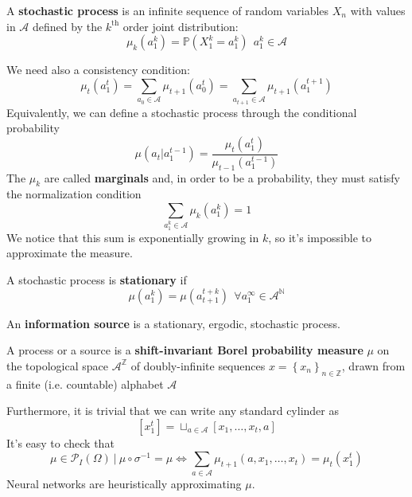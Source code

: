 \begin{definition}
    A \textbf{stochastic process} is an infinite sequence of random variables $X_n$ with values in $\mathcal{A}$ defined by the $k^\text{th}$ order joint distribution:
    \begin{equation*}
        \mu_k\left(a_1^k\right) = \mathbb{P}\left(X_1^k = a_1^k\right) \ \ a_1^k \in \mathcal{A}
    \end{equation*}
\end{definition}
We need also a consistency condition:
\begin{equation*}
    \mu_t\left(a_1^t\right) = \sum_{a_0 \in \mathcal{A}} \mu_{t+1}\left(a_0^t\right) = \sum_{a_{t+1} \in \mathcal{A}} \mu_{t+1}\left(a_1^{t+1}\right)
\end{equation*}
Equivalently, we can define a stochastic process through the conditional probability
\begin{equation*}
    \mu\left(a_t \vert a_1^{t-1}\right) = \frac{\mu_t\left(a_1^t\right)}{\mu_{t-1}\left(a_1^{t-1}\right)}
\end{equation*}
The $\mu_k$ are called \textbf{marginals} and, in order to be a probability, they must satisfy the normalization condition
\begin{equation*}
    \sum_{a_1^k \in \mathcal{A}} \mu_k\left(a_1^k\right) = 1
\end{equation*}
We notice that this sum is exponentially growing in $k$, so it's impossible to approximate the measure.
\begin{definition}
    A stochastic process is \textbf{stationary} if
    \begin{equation*}
        \mu\left(a_1^k\right) = \mu\left(a_{t+1}^{t+k}\right) \ \ \forall a_1^\infty \in \mathcal{A}^\mathbb{N}
    \end{equation*}
\end{definition}
\begin{definition}
    An \textbf{information source} is a stationary, ergodic, stochastic process.
\end{definition}
\begin{definition}
    A process or a source is a \textbf{shift-invariant Borel probability measure} $\mu$ on the topological space $\mathcal{A}^\mathbb{Z}$ of doubly-infinite sequences $x = \left\{x_n\right\}_{n \in \mathbb{Z}}$, drawn from a finite (i.e. countable) alphabet $\mathcal{A}$
\end{definition}
Furthermore, it is trivial that we can write any standard cylinder as
\begin{equation*}
    \left[x_1^t\right] = \sqcup_{a \in \mathcal{A}} \left[x_1, \ldots, x_t, a\right]
\end{equation*}
It's easy to check that
\begin{equation*}
    \mu \in \mathcal{P}_I\left({\Omega}\right) \ \vert \ \mu \circ \sigma^{-1} = \mu \Leftrightarrow \sum_{a \in \mathcal{A}} \mu_{t+1}\left(a, x_1, \ldots, x_t\right) = \mu_t\left(x_1^t\right)
\end{equation*}
Neural networks are heuristically approximating $\mu$.

